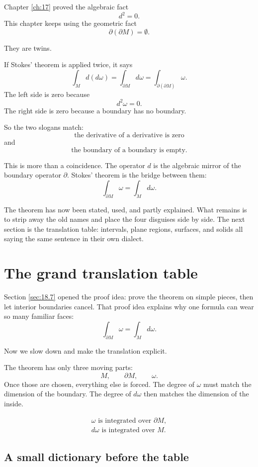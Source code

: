 Chapter \ref{ch:17} proved the algebraic fact
\[
\boxed{
    d^2=0.
}
\]
This chapter keeps using the geometric fact
\[
\boxed{
    \partial(\partial M)=\emptyset.
}
\]

They are twins.

If Stokes' theorem is applied twice, it says
\[
    \int_M d(d\omega)
    =
    \int_{\partial M}d\omega
    =
    \int_{\partial(\partial M)}\omega.
\]
The left side is zero because
\[
    d^2\omega=0.
\]
The right side is zero because a boundary has no boundary.

So the two slogans match:
\[
\boxed{
    \text{the derivative of a derivative is zero}
}
\]
and
\[
\boxed{
    \text{the boundary of a boundary is empty.}
}
\]

This is more than a coincidence.  The operator \(d\) is the algebraic mirror of the
boundary operator \(\partial\).  Stokes' theorem is the bridge between them:
\[
    \int_{\partial M}\omega=\int_M d\omega.
\]

The theorem has now been stated, used, and partly explained.  What remains is to strip
away the old names and place the four disguises side by side.  The next section is the
translation table: intervals, plane regions, surfaces, and solids all saying the same
sentence in their own dialect.
\section{The grand translation table}
\label{sec:18.8}

Section \ref{sec:18.7} opened the proof idea: prove the theorem on simple pieces,
then let interior boundaries cancel.  That proof idea explains why one formula can
wear so many familiar faces:
\[
    \int_{\partial M}\omega=\int_M d\omega.
\]

Now we slow down and make the translation explicit.

The theorem has only three moving parts:
\[
    M,\qquad \partial M,\qquad \omega.
\]
Once those are chosen, everything else is forced.  The degree of \(\omega\) must match
the dimension of the boundary.  The degree of \(d\omega\) then matches the dimension
of the inside.

\[
\boxed{
\begin{array}{c}
\omega \text{ is integrated over } \partial M,\\[1mm]
d\omega \text{ is integrated over } M.
\end{array}
}
\]

\subsection{A small dictionary before the table}

